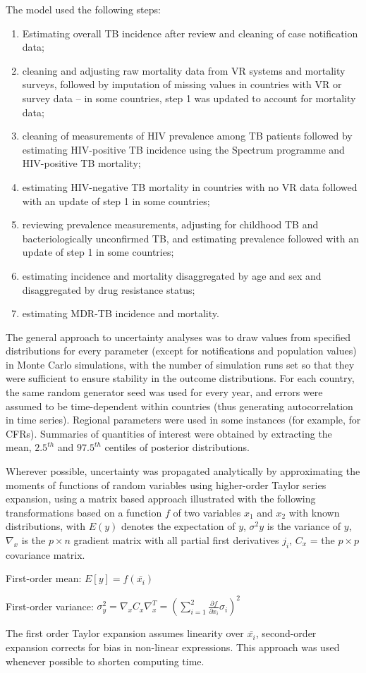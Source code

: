 The model used  the following steps: 

\begin{enumerate}
\item Estimating overall TB incidence after review and cleaning of case notification data;
\item cleaning and adjusting raw mortality data from VR systems and mortality surveys, followed by imputation of missing values in countries with VR or survey data – in some countries, step 1 was updated to account for mortality data;
\item cleaning of measurements of HIV prevalence among TB patients followed by estimating HIV-positive TB incidence using the Spectrum programme and HIV-positive TB mortality;
\item estimating HIV-negative TB mortality in countries with no VR data followed with an update of step 1 in some countries; 
\item reviewing prevalence measurements, adjusting for childhood TB and bacteriologically unconfirmed TB,  and estimating prevalence followed with an update of step 1 in some countries; 
\item estimating incidence and mortality disaggregated by age and sex and disaggregated by drug resistance status;
\item estimating MDR-TB incidence and mortality.
\end{enumerate}

The general approach to uncertainty analyses was to draw values from specified distributions for every parameter (except for notifications and population values) in Monte Carlo simulations, with the number of simulation runs set so that they were sufficient to ensure stability in the outcome distributions. For each country, the same random generator seed was used for every year, and errors were assumed to be time-dependent within countries (thus generating autocorrelation in time series). Regional parameters were used in some instances (for example, for CFRs). Summaries of quantities of interest were obtained by extracting the mean, $2.5^{th}$ and $97.5^{th}$ centiles of posterior distributions. 

Wherever possible, uncertainty was propagated analytically by approximating the moments of functions of random variables using higher-order Taylor series expansion\cite{Ku_1966}, using a matrix based approach\cite{Lab1998-dy} illustrated with the following transformations based on a function $f$ of two variables $x_1$ and $x_2$ with known distributions, with $E(y)$ denotes the expectation of $y$, $\sigma^2 y$ is the variance of $y$, $\nabla_x$ is the $p \times n$ gradient matrix with all partial first derivatives $j_i$, $C_x$ = the $p \times p$ covariance matrix.

First-order mean: $E[y] = f(\bar{x_i})$

First-order variance: $\sigma^2_y=\nabla_x C_x \nabla^T_x=\left(\sum_{i=1}^{2}\frac{\partial{f}}{\partial{x_i}}\sigma_i\right)^2$

The first order Taylor expansion assumes linearity over $\bar {x_i}$, second-order expansion corrects for bias in non-linear expressions. This approach was used whenever possible to shorten computing time.
